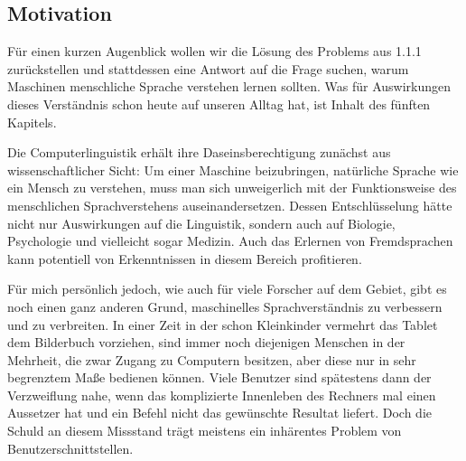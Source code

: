 \documentclass[12pt,a4paper]{article}
\theoremstyle{definition}
\begin{document}
	\subsection{Motivation}
		Für einen kurzen Augenblick wollen wir die Lösung des Problems aus 1.1.1 zurückstellen und stattdessen eine Antwort auf die Frage suchen, warum Maschinen menschliche Sprache verstehen lernen sollten. Was für Auswirkungen dieses Verständnis schon heute auf unseren Alltag hat, ist Inhalt des fünften Kapitels.

		Die Computerlinguistik erhält ihre Daseinsberechtigung zunächst aus wissenschaftlicher Sicht: Um einer Maschine beizubringen, natürliche Sprache wie ein Mensch zu verstehen, muss man sich unweigerlich mit der Funktionsweise des menschlichen Sprachverstehens auseinandersetzen. Dessen Entschlüsselung hätte nicht nur Auswirkungen auf die Linguistik, sondern auch auf Biologie, Psychologie und vielleicht sogar Medizin. Auch das Erlernen von Fremdsprachen kann potentiell von Erkenntnissen in diesem Bereich profitieren.

		Für mich persönlich jedoch, wie auch für viele Forscher auf dem Gebiet, gibt es noch einen ganz anderen Grund, maschinelles Sprachverständnis zu verbessern und zu verbreiten. In einer Zeit in der schon Kleinkinder vermehrt das Tablet dem Bilderbuch vorziehen, sind immer noch diejenigen Menschen in der Mehrheit, die zwar Zugang zu Computern besitzen, aber diese nur in sehr begrenztem Maße bedienen können. Viele Benutzer sind spätestens dann der Verzweiflung nahe, wenn das komplizierte Innenleben des Rechners mal einen Aussetzer hat und ein Befehl nicht das gewünschte Resultat liefert. Doch die Schuld an diesem Missstand trägt meistens ein inhärentes Problem von Benutzerschnittstellen.
\end{document}
